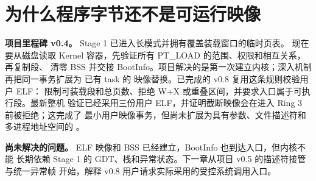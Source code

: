 \chapter{为什么程序字节还不是可运行映像}

\begin{statebox}
\textbf{项目里程碑 v0.4。} Stage 1 已进入长模式并拥有覆盖装载窗口的临时页表。
现在要从磁盘读取 Kernel 容器，先验证所有 PT\_LOAD 的范围、权限和相互关系，再复制段、
清零 BSS 并交接 BootInfo。项目解决的是第一次建立内核；深入机制再把同一事务扩展为
已有 task 的  映像替换。已完成的 v0.8 复用这条规则校验用户 ELF：
限制可装载段和总页数、拒绝 W+X 或重叠区间，并要求入口属于可执行段。最新整机
验证已经采用三份用户 ELF，并证明截断映像会在进入 Ring 3 前被拒绝；这完成了
最小用户映像事务，但尚未扩展为具有参数、文件描述符和多进程地址空间的
。
\end{statebox}


\begin{problemframe}
\textbf{尚未解决的问题。} ELF 映像和 BSS 已经建立，BootInfo 也到达入口，但内核不能
长期依赖 Stage 1 的 GDT、栈和异常状态。下一章从项目 v0.5 的描述符接管与统一异常帧
开始，解释 v0.8 用户请求实际采用的受控系统调用入口。
\end{problemframe}
